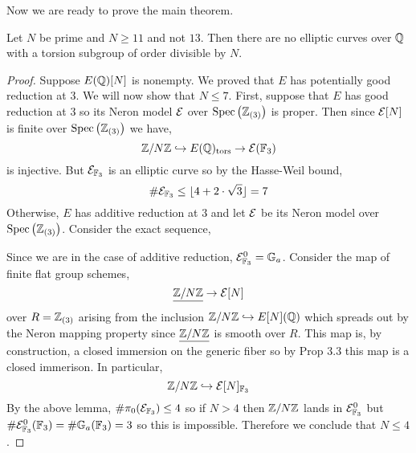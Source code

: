 \documentclass[12pt]{article}
\begin{document}
Now we are ready to prove the main theorem. 

\begin{theorem}[Mazur]
Let $N$ be prime and $N \ge 11$ and not $13$. Then there are no elliptic curves over $\mathbb{Q}$ with a torsion subgroup of order divisible by $N$.
\end{theorem}

\begin{proof}
Suppose $E(\mathbb{Q})[N]$ is nonempty. We proved that $E$ has potentially good reduction at $3$. We will now show that $N \le 7$. First, suppose that $E$ has good reduction at $3$ so its Neron model $\mathcal{E}$ over $\mathrm{Spec}\left( \mathbb{Z}_{(3)} \right)$ is proper. Then since $\mathcal{E}[N]$ is finite over $\mathrm{Spec}\left( \mathbb{Z}_{(3)} \right)$ we have,
\[ \mathbb{Z} / N \mathbb{Z} \hookrightarrow E(\mathbb{Q})_{\mathrm{tors}} \to \mathcal{E}(\mathbb{F}_3) \]
is injective. But $\mathcal{E}_{\mathbb{F}_3}$ is an elliptic curve so by the Hasse-Weil bound,
\[ \# \mathcal{E}_{\mathbb{F}_3} \le \lfloor 4 + 2 \cdot \sqrt{3} \rfloor = 7 \]
Otherwise, $E$ has additive reduction at $3$ and let $\mathcal{E}$ be its Neron model over $\mathrm{Spec}\left( \mathbb{Z}_{(3)} \right)$. Consider the exact sequence,
\begin{center}
\end{center}
Since we are in the case of additive reduction, $\mathcal{E}^0_{\mathbb{F}_3} = {\mathbb{G}_a}$. Consider the map of finite flat group schemes,
\[ \underline{\mathbb{Z} / N \mathbb{Z}} \to \mathcal{E}[N] \]
over $R = \mathbb{Z}_{(3)}$ arising from the inclusion $\mathbb{Z} / N \mathbb{Z} \hookrightarrow E[N](\mathbb{Q})$ which spreads out by the Neron mapping property since $\underline{\mathbb{Z} / N \mathbb{Z}}$ is smooth over $R$. This map is, by construction, a closed immersion on the generic fiber so by Prop 3.3 this map is a closed immerison. In particular,
\[ \mathbb{Z} / N \mathbb{Z} \hookrightarrow \mathcal{E}[N]_{\mathbb{F}_3} \]
By the above lemma, $\# \pi_0(\mathcal{E}_{\mathbb{F}_3}) \le 4$ so if $N > 4$ then $\mathbb{Z} / N \mathbb{Z}$ lands in $\mathcal{E}^0_{\mathbb{F}_3}$ but $\# \mathcal{E}^0_{\mathbb{F}_3}(\mathbb{F}_3) = \# {\mathbb{G}_a}(\mathbb{F}_3) = 3$ so this is impossible. Therefore we conclude that $N \le 4$. 
\end{proof}
\end{document}

